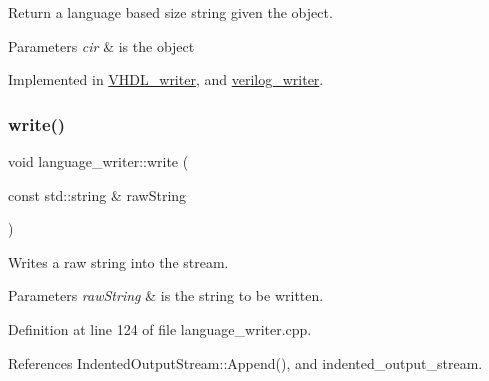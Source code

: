 Return a language based size string given the object. 


\begin{DoxyParams}{Parameters}
{\em cir} & is the object \\
\hline
\end{DoxyParams}


Implemented in \hyperlink{structVHDL__writer_aebe9a464e894d42bd3493c104d537e7f}{V\+H\+D\+L\+\_\+writer}, and \hyperlink{classverilog__writer_aa7a775e57ed2f7d4d613352bd239a279}{verilog\+\_\+writer}.

\mbox{\label{classlanguage__writer_a17a157a423c319a75b20ed1eb8bb6f6e}} 
\subsubsection{\texorpdfstring{write()}{write()}}
{\footnotesize\ttfamily void language\+\_\+writer\+::write (\begin{DoxyParamCaption}\item[{const std\+::string \&}]{raw\+String }\end{DoxyParamCaption})\hspace{0.3cm}{\ttfamily [virtual]}}



Writes a raw string into the stream. 


\begin{DoxyParams}{Parameters}
{\em raw\+String} & is the string to be written. \\
\hline
\end{DoxyParams}


Definition at line 124 of file language\+\_\+writer.\+cpp.



References Indented\+Output\+Stream\+::\+Append(), and indented\+\_\+output\+\_\+stream.

